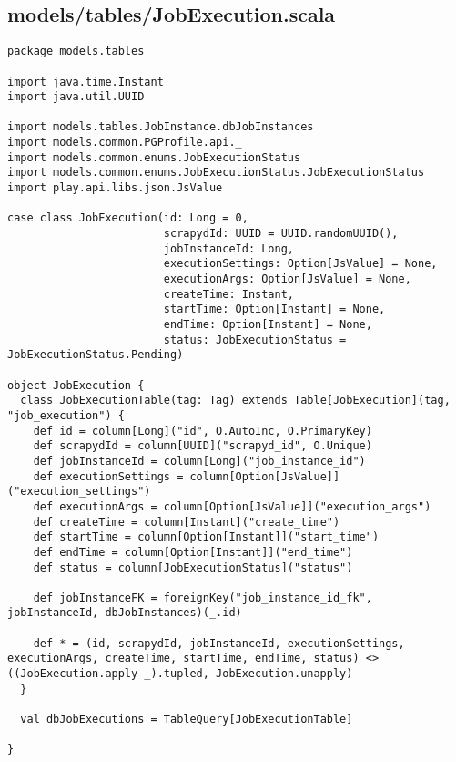 \subsection{models/tables/JobExecution.scala}
\begin{lstlisting}
package models.tables

import java.time.Instant
import java.util.UUID

import models.tables.JobInstance.dbJobInstances
import models.common.PGProfile.api._
import models.common.enums.JobExecutionStatus
import models.common.enums.JobExecutionStatus.JobExecutionStatus
import play.api.libs.json.JsValue

case class JobExecution(id: Long = 0,
                        scrapydId: UUID = UUID.randomUUID(),
                        jobInstanceId: Long,
                        executionSettings: Option[JsValue] = None,
                        executionArgs: Option[JsValue] = None,
                        createTime: Instant,
                        startTime: Option[Instant] = None,
                        endTime: Option[Instant] = None,
                        status: JobExecutionStatus = JobExecutionStatus.Pending)

object JobExecution {
  class JobExecutionTable(tag: Tag) extends Table[JobExecution](tag, "job_execution") {
    def id = column[Long]("id", O.AutoInc, O.PrimaryKey)
    def scrapydId = column[UUID]("scrapyd_id", O.Unique)
    def jobInstanceId = column[Long]("job_instance_id")
    def executionSettings = column[Option[JsValue]]("execution_settings")
    def executionArgs = column[Option[JsValue]]("execution_args")
    def createTime = column[Instant]("create_time")
    def startTime = column[Option[Instant]]("start_time")
    def endTime = column[Option[Instant]]("end_time")
    def status = column[JobExecutionStatus]("status")

    def jobInstanceFK = foreignKey("job_instance_id_fk", jobInstanceId, dbJobInstances)(_.id)

    def * = (id, scrapydId, jobInstanceId, executionSettings, executionArgs, createTime, startTime, endTime, status) <> ((JobExecution.apply _).tupled, JobExecution.unapply)
  }

  val dbJobExecutions = TableQuery[JobExecutionTable]

}
\end{lstlisting}
